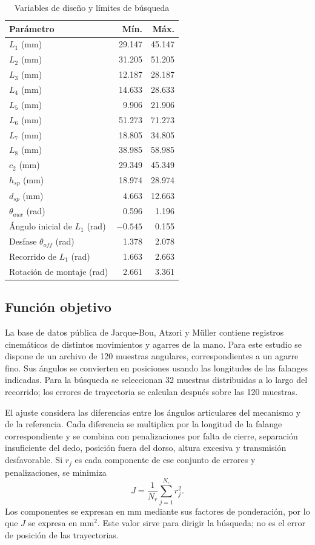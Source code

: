 \documentclass[conference,letterpaper]{IEEEtran}
\begin{document}
\begin{table}[t]
\caption{Variables de diseño y límites de búsqueda}
\label{tab:limites}\centering\footnotesize
\begin{tabular}{lrr}\toprule Parámetro & Mín. & Máx.\\\midrule
$L_1$ (mm)&29.147&45.147\\ $L_2$ (mm)&31.205&51.205\\
$L_3$ (mm)&12.187&28.187\\ $L_4$ (mm)&14.633&28.633\\
$L_5$ (mm)&9.906&21.906\\ $L_6$ (mm)&51.273&71.273\\
$L_7$ (mm)&18.805&34.805\\ $L_8$ (mm)&38.985&58.985\\
$c_2$ (mm)&29.349&45.349\\ $h_{sp}$ (mm)&18.974&28.974\\
$d_{sp}$ (mm)&4.663&12.663\\ $\theta_{aux}$ (rad)&0.596&1.196\\
Ángulo inicial de $L_1$ (rad)&$-0.545$&0.155\\
Desfase $\theta_{off}$ (rad)&1.378&2.078\\
Recorrido de $L_1$ (rad)&1.663&2.663\\
Rotación de montaje (rad)&2.661&3.361\\\bottomrule
\end{tabular}
\end{table}

\subsection{Función objetivo}
La base de datos pública de Jarque-Bou, Atzori y Müller \cite{r1} contiene registros cinemáticos de distintos movimientos y agarres de la mano. Para este estudio se dispone de un archivo de 120 muestras angulares, correspondientes a un agarre fino. Sus ángulos se convierten en posiciones usando las longitudes de las falanges indicadas. Para la búsqueda se seleccionan 32 muestras distribuidas a lo largo del recorrido; los errores de trayectoria se calculan después sobre las 120 muestras.

El ajuste considera las diferencias entre los ángulos articulares del mecanismo y de la referencia. Cada diferencia se multiplica por la longitud de la falange correspondiente y se combina con penalizaciones por falta de cierre, separación insuficiente del dedo, posición fuera del dorso, altura excesiva y transmisión desfavorable. Si $r_j$ es cada componente de ese conjunto de errores y penalizaciones, se minimiza
\begin{equation}
J=\frac{1}{N_r}\sum_{j=1}^{N_r}r_j^2.
\label{eq:objetivo}
\end{equation}
Los componentes se expresan en mm mediante sus factores de ponderación, por lo que $J$ se expresa en mm$^2$. Este valor sirve para dirigir la búsqueda; no es el error de posición de las trayectorias.
\end{document}
